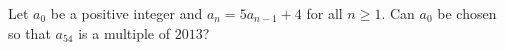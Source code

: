 Let $a_0$ be a positive integer and $a_n=5a_{n-1}+4$ for all $n\ge 1$. Can $a_0$ be chosen so that $a_{54}$ is a multiple of $2013$?